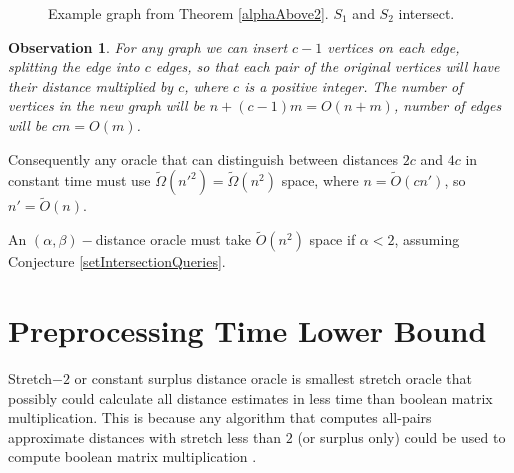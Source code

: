 \documentclass[shortabstract, lic, english]{iithesis}
\theoremstyle{definition} \newtheorem{definition}{Definition}[chapter]
\theoremstyle{plain} \newtheorem{remark}[definition]{Observation}
\theoremstyle{plain} \newtheorem{theorem}[definition]{Theorem}
\theoremstyle{plain} \newtheorem{lemma}[definition]{Lemma}
\theoremstyle{plain} \newtheorem{conjecture}[definition]{Conjecture}
\begin{document}
\begin{figure}[h]
    \centering              
    \caption{Example graph from Theorem \ref{alphaAbove2}. $S_1$ and $S_2$ intersect.}
\end{figure}

\begin{remark}
    For any graph we can insert $c-1$ vertices on each edge, splitting the edge into $c$ edges,
    so that each pair of the original vertices will have their distance multiplied by $c$, where $c$ is a positive integer.
    The number of vertices in the new graph will be $n + (c-1)m = O(n + m)$, number of edges will be $cm = O(m)$.
\end{remark}

Consequently any oracle that can distinguish between distances $2c$ and $4c$ in constant time must use $\tilde{\Omega}(n'^2) = \tilde{\Omega}(n^2)$ space,
where $n = \tilde{O}(cn')$, so $n' = \tilde{O}(n)$.

An $(\alpha, \beta)-$distance oracle must take $\tilde{O}(n^2)$ space if $\alpha < 2$, assuming Conjecture \ref{setIntersectionQueries}.

\section{Preprocessing Time Lower Bound}
Stretch$-2$ or constant surplus distance oracle is smallest stretch oracle that possibly could calculate all distance estimates in less time than boolean matrix multiplication.
This is because any algorithm that computes all-pairs approximate distances with stretch less than $2$ (or surplus only)
could be used to compute boolean matrix multiplication \cite{matrixLowerBound}.
\end{document}
